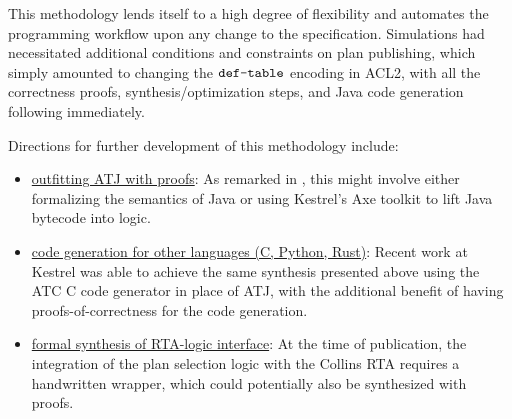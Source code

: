 
This methodology lends itself to a high degree of flexibility and automates the programming workflow upon any change to the specification. Simulations had necessitated additional conditions and constraints on plan publishing, which simply amounted to changing the $\verb+def-table+$ encoding in ACL2, with all the correctness proofs, synthesis/optimization steps, and Java code generation following immediately.


Directions for further development of this methodology include:
\begin{itemize}
\item \underline{outfitting ATJ with proofs}: As remarked in \cite{dasc2020}, this might involve either formalizing the semantics of Java or using Kestrel's Axe toolkit to lift Java bytecode into logic.
\item \underline{code generation for other languages (C, Python, Rust)}: Recent work at Kestrel was able to achieve the same synthesis presented above using the ATC C code generator in place of ATJ, with the additional benefit of having proofs-of-correctness for the code generation.
\item \underline{formal synthesis of RTA-logic interface}: At the time of publication, the integration of the plan selection logic with the Collins RTA requires a handwritten wrapper, which could potentially also be synthesized with proofs.
\end{itemize}